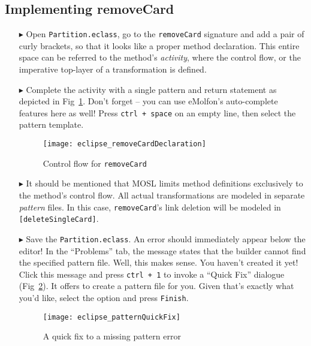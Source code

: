 \newpage
\hypertarget{remCard tex}{}
\subsection{Implementing removeCard}
\texHeader

\begin{itemize}

\item[$\blacktriangleright$] Open \texttt{Partition.eclass}, go to the \texttt{removeCard} signature and add a pair of curly brackets, so that it looks like a
proper method declaration. This entire space can be referred to the method's \emph{activity}, where the control flow, or the imperative top-layer of a
transformation is defined.

\item[$\blacktriangleright$] Complete the activity with a single pattern and return statement as depicted in Fig~\ref{fig:remCardDec}. Don't forget -- you can
use eMolfon's auto-complete features here as well! Press \texttt{ctrl + space} on an empty line, then select the pattern template.

\begin{figure}[htp]
\begin{center}
  \texttt{[image: eclipse\_removeCardDeclaration]}
  \caption{Control flow for \texttt{removeCard}}
  \label{fig:remCardDec}
\end{center}
\end{figure}

\item[$\blacktriangleright$] It should be mentioned that MOSL limits method definitions exclusively to the method's control flow. All actual transformations are
modeled in separate \emph{pattern} files. In this case, \texttt{removeCard}'s link deletion will be modeled in \texttt{[deleteSingleCard]}.

\item[$\blacktriangleright$] Save the \texttt{Partition.eclass}. An error should immediately appear below the editor! In the ``Problems'' tab, the message
states that the builder cannot find the specified pattern file. Well, this makes sense. You haven't created it yet! Click this message and press \texttt{ctrl +
1} to invoke a ``Quick Fix'' dialogue (Fig~\ref{fig:quixFix}). It offers to create a pattern file for you. Given that's exactly what you'd like, select the option
and press \texttt{Finish}.

\begin{figure}[htp]
\begin{center}
  \texttt{[image: eclipse\_patternQuickFix]}
  \caption{A quick fix to a missing pattern error}
  \label{fig:quixFix}
\end{center}
\end{figure}


\end{itemize}
